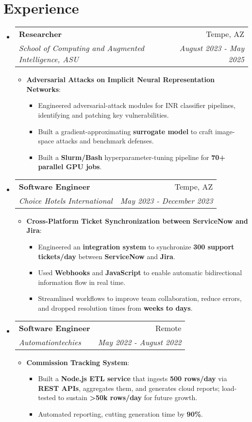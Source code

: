 \documentclass[letterpaper,10pt]{article}
\makeatletter
\newcommand{\resumeItem}[2]{%
  \item[\textbullet]\small{%
    \textbf{#1}: #2 \vspace{-2pt}%
  }%
}
\newcommand{\resumeSubheading}[4]{%
  \item[]%
  \vspace{-1pt}%
  \begin{tabular*}{0.97\textwidth}{l@{\extracolsep{\fill}}r}%
    \textbf{#1} & #2 \\%
    \textit{\small #3} & \textit{\small #4} \\%
  \end{tabular*}%
  \vspace{-5pt}%
}
\newcommand{\resumeSubHeadingListStart}{\begin{itemize}[leftmargin=*]}
\newcommand{\resumeSubHeadingListEnd}{\end{itemize}}
\newcommand{\resumeItemListStart}{\begin{itemize}}
\newcommand{\resumeItemListEnd}{\end{itemize}\vspace{-5pt}}
\makeatother
\begin{document}
\section{Experience}
\resumeSubHeadingListStart
    \resumeSubheading
        {Researcher}{Tempe, AZ}
        {School of Computing and Augmented Intelligence, ASU}{August 2023 - May 2025}
        \resumeItemListStart
            \resumeItem{Adversarial Attacks on Implicit Neural Representation Networks}
            {
            \begin{itemize}[label=-]
                \item Engineered adversarial-attack modules for INR classifier pipelines, identifying and patching key vulnerabilities.
                \item Built a gradient-approximating \textbf{surrogate model} to craft image-space attacks and benchmark defenses.
                \item Built a \textbf{Slurm/Bash} hyperparameter-tuning pipeline for \textbf{70+ parallel GPU jobs}.
    
            \end{itemize}
            }            
        \resumeItemListEnd    

    \resumeSubheading
    {Software Engineer \normalfont{\textit{(Intern)}}}{Tempe, AZ}
    {Choice Hotels International}{May 2023 - December 2023}
    \resumeItemListStart
        \resumeItem{Cross-Platform Ticket Synchronization between ServiceNow and Jira}
        {
        \begin{itemize}[label=-]
            \item Engineered an \textbf{integration system} to synchronize \textbf{300 support tickets/day} between \textbf{ServiceNow} and \textbf{Jira}.
            \item Used \textbf{Webhooks} and \textbf{JavaScript} to enable automatic bidirectional information flow in real time.
            \item Streamlined workflows to improve team collaboration, reduce errors, and dropped resolution times from \textbf{weeks to days}.
        \end{itemize}
        }
    \resumeItemListEnd

    \resumeSubheading
    {Software Engineer \normalfont{\textit{(Intern)}}}{Remote}
    {Automationtechies}{May 2022 -  August 2022}
        \resumeItemListStart
            \resumeItem{Commission Tracking System}
            {
            \begin{itemize}[label=-]
                \item Built a \textbf{Node.js ETL service} that ingests \textbf{500 rows/day} via \textbf{REST APIs}, aggregates them, and generates cloud reports; load-tested to sustain \textbf{\textgreater{}50k rows/day} for future growth.
                \item Automated reporting, cutting generation time by \textbf{90\%}.
            \end{itemize} 
            }
        \resumeItemListEnd
\resumeSubHeadingListEnd
\end{document}
